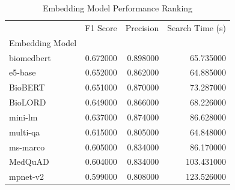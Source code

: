 \begin{table}
\caption{Embedding Model Performance Ranking}
\label{tab:embedding_ranking}
\begin{tabular}{lrrr}
\toprule
 & F1 Score & Precision & Search Time (s) \\
Embedding Model &  &  &  \\
\midrule
biomedbert & 0.672000 & 0.898000 & 65.735000 \\
e5-base & 0.652000 & 0.862000 & 64.885000 \\
BioBERT & 0.651000 & 0.870000 & 73.287000 \\
BioLORD & 0.649000 & 0.866000 & 68.226000 \\
mini-lm & 0.637000 & 0.874000 & 86.628000 \\
multi-qa & 0.615000 & 0.805000 & 64.848000 \\
ms-marco & 0.605000 & 0.834000 & 86.170000 \\
MedQuAD & 0.604000 & 0.834000 & 103.431000 \\
mpnet-v2 & 0.599000 & 0.808000 & 123.526000 \\
\bottomrule
\end{tabular}
\end{table}
